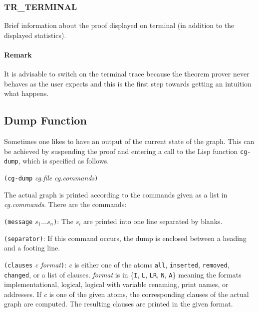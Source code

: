 \PO
{}

\subsubsection{TR\_TERMINAL}
  

Brief information about the proof displayed on terminal (in addition to the 
displayed statistics).

\PO
{}

\paragraph{Remark}
It is advisable to switch on the terminal trace because the theorem prover
never behaves as the user expects and this is the first step towards getting
an intuition what happens.


\subsection{Dump Function}
Sometimes one likes to have an output of the current state of the
graph. This can be achieved by suspending the proof and entering a
call to the Lisp function {\tt cg-dump}, which is specified as
follows.

{\tt (cg-dump} {\em cg.file} {\em cg.commands}{\tt )}

The actual graph is printed according to the commands given as a list
in {\em cg.commands}. There are the commands:

{\tt (message} $s_1 \dots s_n${\tt )}: The $s_i$ are 
printed into one line separated by blanks.
             
{\tt (separator)}: If this command occurs, the dump is enclosed
between a heading and a footing line.
             
{\tt (clauses} {\em c format}{\tt )}: {\em c} is either one of the
atoms {\tt all}, {\tt inserted}, {\tt removed}, {\tt changed}, or
a list of clauses. {\em format} is in \{{\tt I}, {\tt L},
{\tt LR}, {\tt N}, {\tt A}\} meaning the formats implementational,
logical, logical with variable renaming, print names, or addresses.
If {\em c} is one of the given atoms, the
corresponding clauses of the actual graph are computed.
The resulting clauses are printed in the given
format.

